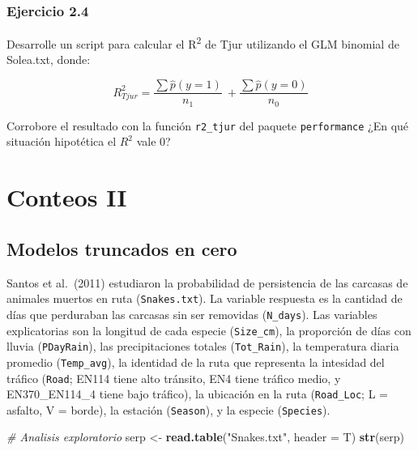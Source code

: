 \documentclass[
]{book}
\newenvironment{Shaded}{\begin{snugshade}}{\end{snugshade}}
\newcommand{\CommentTok}[1]{\textcolor[rgb]{0.56,0.35,0.01}{\textit{#1}}}
\newcommand{\DataTypeTok}[1]{\textcolor[rgb]{0.13,0.29,0.53}{#1}}
\newcommand{\KeywordTok}[1]{\textcolor[rgb]{0.13,0.29,0.53}{\textbf{#1}}}
\newcommand{\NormalTok}[1]{#1}
\newcommand{\StringTok}[1]{\textcolor[rgb]{0.31,0.60,0.02}{#1}}
\begin{document}
\hypertarget{ejercicio-2.4}{%
\subsubsection{Ejercicio 2.4}\label{ejercicio-2.4}}

Desarrolle un script para calcular el R\textsuperscript{2} de Tjur utilizando el GLM binomial de Solea.txt, donde:

\[R^{2}_{Tjur} = \frac{\sum \hat{p}(y = 1)}{n_1}\ + \frac{\sum \hat{p}(y = 0)}{n_0}\]

Corrobore el resultado con la función \texttt{r2\_tjur} del paquete \texttt{performance} ¿En qué situación hipotética el \(R^2\) vale 0?

\hypertarget{conteos-ii}{%
\section{Conteos II}\label{conteos-ii}}

\hypertarget{modelos-truncados-en-cero}{%
\subsection{Modelos truncados en cero}\label{modelos-truncados-en-cero}}

Santos et al.~(2011) estudiaron la probabilidad de persistencia de las carcasas de animales muertos en ruta (\texttt{Snakes.txt}). La variable respuesta es la cantidad de días que perduraban las carcasas sin ser removidas (\texttt{N\_days}). Las variables explicatorias son la longitud de cada especie (\texttt{Size\_cm}), la proporción de días con lluvia (\texttt{PDayRain}), las precipitaciones totales (\texttt{Tot\_Rain}), la temperatura diaria promedio (\texttt{Temp\_avg}), la identidad de la ruta que representa la intesidad del tráfico (\texttt{Road}; EN114 tiene alto tránsito, EN4 tiene tráfico medio, y EN370\_EN114\_4 tiene bajo tráfico), la ubicación en la ruta (\texttt{Road\_Loc}; L = asfalto, V = borde), la estación (\texttt{Season}), y la especie (\texttt{Species}).

\begin{Shaded}
\begin{Highlighting}[]
\CommentTok{# Analisis exploratorio}
\NormalTok{serp <-}\StringTok{ }\KeywordTok{read.table}\NormalTok{(}\StringTok{"Snakes.txt"}\NormalTok{, }\DataTypeTok{header =}\NormalTok{ T) }
\KeywordTok{str}\NormalTok{(serp)}
\end{Highlighting}
\end{Shaded}
\end{document}
